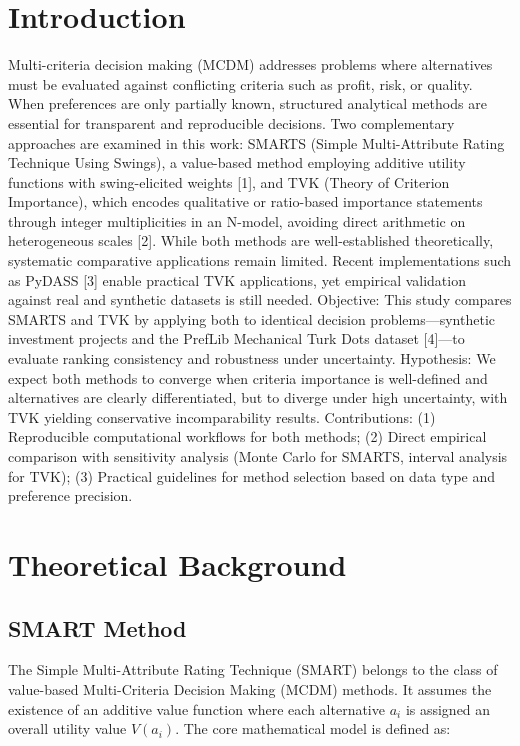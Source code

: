 \documentclass[conference]{IEEEtran}
\begin{document}
\section{Introduction}
Multi-criteria decision making (MCDM) addresses problems where alternatives must be evaluated against conflicting criteria such as profit, risk, or quality. When preferences are only partially known, structured analytical methods are essential for transparent and reproducible decisions.
Two complementary approaches are examined in this work: SMARTS (Simple Multi-Attribute Rating Technique Using Swings), a value-based method employing additive utility functions with swing-elicited weights [1], and TVK (Theory of Criterion Importance), which encodes qualitative or ratio-based importance statements through integer multiplicities in an N-model, avoiding direct arithmetic on heterogeneous scales [2].
While both methods are well-established theoretically, systematic comparative applications remain limited. Recent implementations such as PyDASS [3] enable practical TVK applications, yet empirical validation against real and synthetic datasets is still needed.
Objective: This study compares SMARTS and TVK by applying both to identical decision problems—synthetic investment projects and the PrefLib Mechanical Turk Dots dataset [4]—to evaluate ranking consistency and robustness under uncertainty.
Hypothesis: We expect both methods to converge when criteria importance is well-defined and alternatives are clearly differentiated, but to diverge under high uncertainty, with TVK yielding conservative incomparability results.
Contributions: (1) Reproducible computational workflows for both methods; (2) Direct empirical comparison with sensitivity analysis (Monte Carlo for SMARTS, interval analysis for TVK); (3) Practical guidelines for method selection based on data type and preference precision. 

\section{Theoretical Background}

\subsection{SMART Method}

The Simple Multi-Attribute Rating Technique (SMART) belongs to the class of value-based Multi-Criteria Decision Making (MCDM) methods. It assumes the existence of an additive value function where each alternative $a_i$ is assigned an overall utility value $V(a_i)$. The core mathematical model is defined as:
\end{document}
